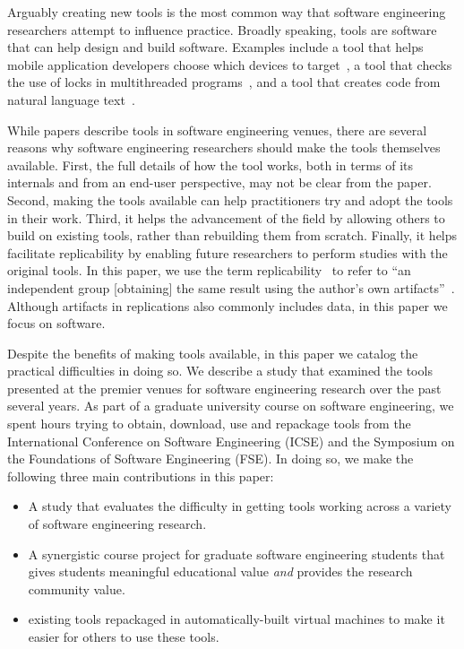 \documentclass[10pt,conference]{IEEEtran}
\begin{document}
Arguably creating new tools is the most common
way that software engineering researchers
attempt to influence practice.
Broadly speaking, tools are software that can
help design and build software.
Examples include a tool that helps mobile application
developers choose which devices to target~\cite{prada},
a tool that checks the use of locks in multithreaded programs~\cite{ernst},
and a tool that creates code from natural language text~\cite{desai}.

While papers describe tools in software engineering venues,
there are several reasons why software engineering researchers 
should make the tools themselves available.
First, the full details of how the tool works, both in terms of its internals
and from an end-user perspective, may not be clear from the paper.
Second, making the tools available can help practitioners try and adopt
the tools in their work.
Third, it helps the advancement of the field by allowing others to build on 
existing tools, rather than rebuilding them from scratch.
Finally, it helps facilitate replicability by enabling future researchers
to perform studies with the original tools.
In this paper, we use the term replicability~\cite{vim2004international}
to refer to ``an independent group [obtaining] the same result using 
the author's own artifacts''~\cite{acmArtifactPolicy}.
Although artifacts in replications also commonly includes data,
in this paper we focus on software.

Despite the benefits of making tools available, in this paper
we catalog the practical difficulties in doing so.
We describe a study that examined the tools presented at the 
premier venues for software engineering research over the 
past several years.
As part of a graduate university course on software engineering, 
we spent \durationTotal hours trying to obtain, download, use
and repackage tools from the International Conference
on Software Engineering (ICSE) and the Symposium on the Foundations
of Software Engineering (FSE).
In doing so, we make the following three main 
contributions in this paper:

\begin{itemize}
  \item A study that evaluates the difficulty in getting \totalToolsTried tools 
  		working across a variety of software engineering research.
  \item A synergistic course project for graduate software engineering students 
		that gives students meaningful educational value \emph{and}
		provides the research community value.
  \item \permissionToRedistribute existing tools repackaged in automatically-built virtual machines
  		to make it easier for others to use these tools.
\end{itemize}
\end{document}
